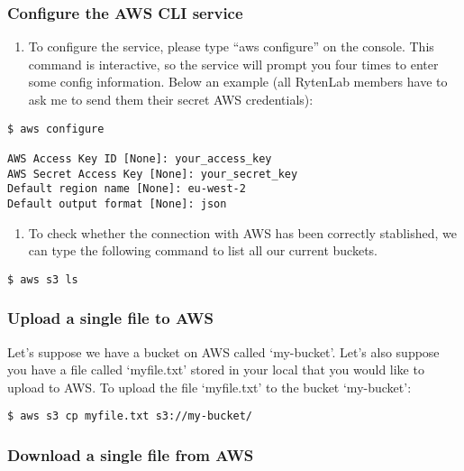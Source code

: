 \documentclass[]{book}
\providecommand{\tightlist}{%
  \setlength{\itemsep}{0pt}\setlength{\parskip}{0pt}}
\begin{document}
\subsubsection{Configure the AWS CLI
service}\label{configure-the-aws-cli-service}

\begin{enumerate}
\def\labelenumi{\arabic{enumi}.}
\tightlist
\item
  To configure the service, please type ``aws configure'' on the
  console. This command is interactive, so the service will prompt you
  four times to enter some config information. Below an example (all
  RytenLab members have to ask me to send them their secret AWS
  credentials):
\end{enumerate}

\begin{verbatim}
$ aws configure 

AWS Access Key ID [None]: your_access_key 
AWS Secret Access Key [None]: your_secret_key 
Default region name [None]: eu-west-2 
Default output format [None]: json 
\end{verbatim}

\begin{enumerate}
\def\labelenumi{\arabic{enumi}.}
\setcounter{enumi}{1}
\tightlist
\item
  To check whether the connection with AWS has been correctly
  stablished, we can type the following command to list all our current
  buckets.
\end{enumerate}

\begin{verbatim}
$ aws s3 ls 
\end{verbatim}

\subsubsection{Upload a single file to
AWS}\label{upload-a-single-file-to-aws}

Let's suppose we have a bucket on AWS called `my-bucket'. Let's also
suppose you have a file called `myfile.txt' stored in your local that
you would like to upload to AWS. To upload the file `myfile.txt' to the
bucket `my-bucket':

\begin{verbatim}
$ aws s3 cp myfile.txt s3://my-bucket/ 
\end{verbatim}

\subsubsection{Download a single file from
AWS}\label{download-a-single-file-from-aws}
\end{document}
